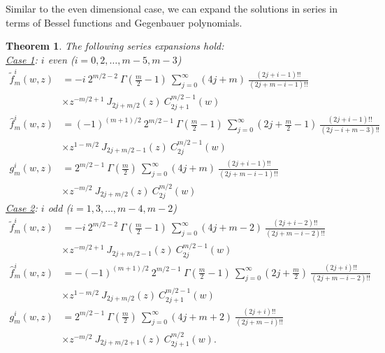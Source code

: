 \documentclass{amsart}
\newtheorem{theorem}{Theorem}[section]
\theoremstyle{remark}
\begin{document}
Similar to the even dimensional case, we can expand the solutions in series in terms of Bessel functions and Gegenbauer polynomials.

\begin{theorem} 
\label{SeriesOdd}
The following series expansions hold:\vspace{0,2cm}\\
\emph{\underline{Case 1}: $i$ even ($i=0,2,\ldots,m-5,m-3$)}
\begin{align*}
\tilde{f}_m^i(w,z) &= - i \ 2^{m/2-2} \ \Gamma \left( \frac{m}{2}-1 \right)   \  \sum_{j=0}^{\infty} (4j+m) \ \frac{(2j+i-1)!!}{(2j+m-i-1)!!}\\
 & \times   z^{-m/2+1} \ J_{2j+m/2}(z) \ C_{2j+1}^{m/2-1}(w)\\
 \hat{f}_m^i(w,z) &=  (-1)^{(m+1)/2} \ 2^{m/2-1} \ \Gamma \left( \frac{m}{2}-1 \right) \ \sum_{j=0}^{\infty} \left( 2j + \frac{m}{2}-1 \right) \ \frac{(2j+i-1)!!}{(2j-i+m-3)!!}\\
  & \times  z^{1-m/2} \ J_{2j+m/2-1}(z) \ C_{2j}^{m/2-1}(w)\\
g_m^i(w,z) &=   2^{m/2-1} \ \Gamma \left( \frac{m}{2}\right) \ \sum_{j=0}^{\infty} (4j+m) \ \frac{(2j+i-1)!!}{(2j+m-i-1)!!}\\
& \times    z^{-m/2} \ J_{2j+m/2}(z) \ C_{2j}^{m/2}(w)
\end{align*}
\emph{\underline{Case 2}: $i$ odd ($i=1,3,\ldots, m-4, m-2$)}
\begin{align*}
\tilde{f}_m^i(w,z) &= - i \ 2^{m/2-2} \ \Gamma \left( \frac{m}{2}-1 \right)  \  \sum_{j=0}^{\infty} (4j+m-2) \ \frac{(2j+i-2)!!}{(2j+m-i-2)!!}\\
& \times   z^{-m/2+1} \ J_{2j+m/2-1}(z) \ C_{2j}^{m/2-1}(w)\\
\hat{f}_m^i(w,z) &=  - (-1)^{(m+1)/2} \ 2^{m/2-1} \ \Gamma \left( \frac{m}{2}-1 \right) \ \sum_{j=0}^{\infty} \left( 2j + \frac{m}{2} \right) \ \frac{(2j+i)!!}{(2j+m-i-2)!!}\\
& \times  z^{1-m/2} \ J_{2j+m/2}(z) \ C_{2j+1}^{m/2-1}(w)\\
g_m^i(w,z) &=   2^{m/2-1} \ \Gamma \left( \frac{m}{2} \right) \ \sum_{j=0}^{\infty}(4j+m+2) \  \frac{(2j+i)!!}{(2j+m-i)!!}\\
& \times    z^{-m/2} \ J_{2j+m/2+1}(z) \ C_{2j+1}^{m/2}(w).
\end{align*}
\end{theorem}
\end{document}
